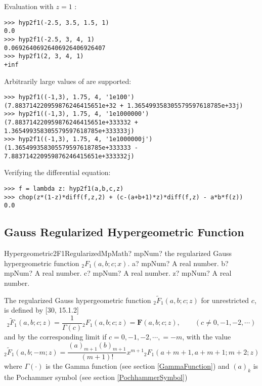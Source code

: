 Evaluation with $z=1$ :

\begin{lstlisting}
>>> hyp2f1(-2.5, 3.5, 1.5, 1)
0.0
>>> hyp2f1(-2.5, 3, 4, 1)
0.06926406926406926406926407
>>> hyp2f1(2, 3, 4, 1)
+inf
\end{lstlisting}


Arbitrarily large values of are supported:

\begin{lstlisting}
>>> hyp2f1((-1,3), 1.75, 4, '1e100')
(7.883714220959876246415651e+32 + 1.365499358305579597618785e+33j)
>>> hyp2f1((-1,3), 1.75, 4, '1e1000000')
(7.883714220959876246415651e+333332 + 1.365499358305579597618785e+333333j)
>>> hyp2f1((-1,3), 1.75, 4, '1e1000000j')
(1.365499358305579597618785e+333333 - 7.883714220959876246415651e+333332j)
\end{lstlisting}

Verifying the differential equation:

\begin{lstlisting}
>>> f = lambda z: hyp2f1(a,b,c,z)
>>> chop(z*(1-z)*diff(f,z,2) + (c-(a+b+1)*z)*diff(f,z) - a*b*f(z))
0.0
\end{lstlisting}



\subsection{Gauss Regularized Hypergeometric Function}

\begin{mpFunctionsExtract}
	\mpFunctionFourNotImplemented
	{Hypergeometric2F1RegularizedMpMath? mpNum? the regularized Gauss hypergeometric function ${}_2F_1(a, b; c; x)$.}
	{a? mpNum? A real number.}
	{b? mpNum? A real number.}
	{c? mpNum? A real number.}
	{z? mpNum? A real number.}
\end{mpFunctionsExtract}

\vspace{0.3cm}
The regularized Gauss hypergeometric function ${}_2\widetilde{F}_1(a,b;c;z)$ for unrestricted $c$, is defined by [30, 15.1.2]
\begin{equation}
{}_2\widetilde{F}_1(a,b;c;z)  = \frac{1}{\Gamma(c)} {}_2F_1(a,b;c;z) = \boldsymbol{F}(a,b;c;z), \quad \quad (c \neq	0, -1, -2, \cdots)
\end{equation}
and by the corresponding limit if $c = 0, -1, -2, \cdots, = -m$, with the value
\begin{equation}
{}_2\widetilde{F}_1(a,b;-m;z)  = \frac{(a)_{m+1}(b)_{m+1}}{(m+1)!} x^{m+1} {}_2F_1(a+m+1,a+m+1;m+2;z) 
\end{equation}
where $\Gamma(\cdot)$ is the Gamma function (see section \ref{GammaFunction}) and $(a)_k$ is the Pochammer symbol (see section \ref{PochhammerSymbol})

